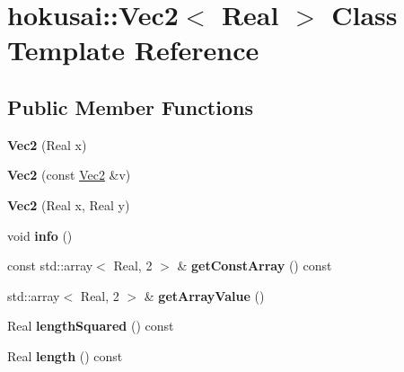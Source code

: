 \hypertarget{classhokusai_1_1Vec2}{\section{hokusai\+:\+:Vec2$<$ Real $>$ Class Template Reference}
\label{classhokusai_1_1Vec2}
}
\subsection*{Public Member Functions}
\begin{DoxyCompactItemize}
\item 
\hypertarget{classhokusai_1_1Vec2_aee90c82b6e12f21b37b45fae0750c130}{{\bfseries Vec2} (Real x)}\label{classhokusai_1_1Vec2_aee90c82b6e12f21b37b45fae0750c130}

\item 
\hypertarget{classhokusai_1_1Vec2_ac713e71ad2e89b6c02ba92b4804aba8b}{{\bfseries Vec2} (const \hyperlink{classhokusai_1_1Vec2}{Vec2} \&v)}\label{classhokusai_1_1Vec2_ac713e71ad2e89b6c02ba92b4804aba8b}

\item 
\hypertarget{classhokusai_1_1Vec2_af57593621830e50916e0e963fac469b7}{{\bfseries Vec2} (Real x, Real y)}\label{classhokusai_1_1Vec2_af57593621830e50916e0e963fac469b7}

\item 
\hypertarget{classhokusai_1_1Vec2_a44a6e743ca8af2703d2c8a94ad9f3bd7}{void {\bfseries info} ()}\label{classhokusai_1_1Vec2_a44a6e743ca8af2703d2c8a94ad9f3bd7}

\item 
\hypertarget{classhokusai_1_1Vec2_a3b5c1b85b4a721d1412b190d894eadba}{const std\+::array$<$ Real, 2 $>$ \& {\bfseries get\+Const\+Array} () const }\label{classhokusai_1_1Vec2_a3b5c1b85b4a721d1412b190d894eadba}

\item 
\hypertarget{classhokusai_1_1Vec2_a5fb7b91c8391676e2dce9ef9f69089b7}{std\+::array$<$ Real, 2 $>$ \& {\bfseries get\+Array\+Value} ()}\label{classhokusai_1_1Vec2_a5fb7b91c8391676e2dce9ef9f69089b7}

\item 
\hypertarget{classhokusai_1_1Vec2_a3cd045ff6722ea76c767f4875ba72d7a}{Real {\bfseries length\+Squared} () const }\label{classhokusai_1_1Vec2_a3cd045ff6722ea76c767f4875ba72d7a}

\item 
\hypertarget{classhokusai_1_1Vec2_a3d3b1be6fbc86dbf980817a2b200dbfa}{Real {\bfseries length} () const }\label{classhokusai_1_1Vec2_a3d3b1be6fbc86dbf980817a2b200dbfa}


\end{DoxyCompactItemize}
